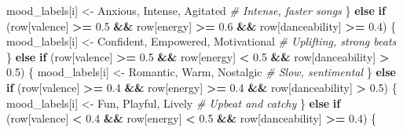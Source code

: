 \documentclass[
]{article}
\newenvironment{Shaded}{\begin{snugshade}}{\end{snugshade}}
\newcommand{\CommentTok}[1]{\textcolor[rgb]{0.56,0.35,0.01}{\textit{#1}}}
\newcommand{\ControlFlowTok}[1]{\textcolor[rgb]{0.13,0.29,0.53}{\textbf{#1}}}
\newcommand{\FloatTok}[1]{\textcolor[rgb]{0.00,0.00,0.81}{#1}}
\newcommand{\NormalTok}[1]{#1}
\newcommand{\OtherTok}[1]{\textcolor[rgb]{0.56,0.35,0.01}{#1}}
\newcommand{\SpecialCharTok}[1]{\textcolor[rgb]{0.81,0.36,0.00}{\textbf{#1}}}
\newcommand{\StringTok}[1]{\textcolor[rgb]{0.31,0.60,0.02}{#1}}
\begin{document}
\begin{Shaded}
\begin{Highlighting}[]
\NormalTok{    mood\_labels[i] }\OtherTok{\textless{}{-}} \StringTok{\textquotesingle{}Anxious, Intense, Agitated\textquotesingle{}}  \CommentTok{\# Intense, faster songs}
\NormalTok{  \} }\ControlFlowTok{else} \ControlFlowTok{if}\NormalTok{ (row[}\StringTok{\textquotesingle{}valence\textquotesingle{}}\NormalTok{] }\SpecialCharTok{\textgreater{}=} \FloatTok{0.5} \SpecialCharTok{\&\&}\NormalTok{ row[}\StringTok{\textquotesingle{}energy\textquotesingle{}}\NormalTok{] }\SpecialCharTok{\textgreater{}=} \FloatTok{0.6} \SpecialCharTok{\&\&}\NormalTok{ row[}\StringTok{\textquotesingle{}danceability\textquotesingle{}}\NormalTok{] }\SpecialCharTok{\textgreater{}=} \FloatTok{0.4}\NormalTok{) \{}
\NormalTok{    mood\_labels[i] }\OtherTok{\textless{}{-}} \StringTok{\textquotesingle{}Confident, Empowered, Motivational\textquotesingle{}}  \CommentTok{\# Uplifting, strong beats}
\NormalTok{  \} }\ControlFlowTok{else} \ControlFlowTok{if}\NormalTok{ (row[}\StringTok{\textquotesingle{}valence\textquotesingle{}}\NormalTok{] }\SpecialCharTok{\textgreater{}=} \FloatTok{0.5} \SpecialCharTok{\&\&}\NormalTok{ row[}\StringTok{\textquotesingle{}energy\textquotesingle{}}\NormalTok{] }\SpecialCharTok{\textless{}} \FloatTok{0.5} \SpecialCharTok{\&\&}\NormalTok{ row[}\StringTok{\textquotesingle{}danceability\textquotesingle{}}\NormalTok{] }\SpecialCharTok{\textgreater{}} \FloatTok{0.5}\NormalTok{) \{}
\NormalTok{    mood\_labels[i] }\OtherTok{\textless{}{-}} \StringTok{\textquotesingle{}Romantic, Warm, Nostalgic\textquotesingle{}}  \CommentTok{\# Slow, sentimental}
\NormalTok{  \} }\ControlFlowTok{else} \ControlFlowTok{if}\NormalTok{ (row[}\StringTok{\textquotesingle{}valence\textquotesingle{}}\NormalTok{] }\SpecialCharTok{\textgreater{}=} \FloatTok{0.4} \SpecialCharTok{\&\&}\NormalTok{ row[}\StringTok{\textquotesingle{}energy\textquotesingle{}}\NormalTok{] }\SpecialCharTok{\textgreater{}=} \FloatTok{0.4} \SpecialCharTok{\&\&}\NormalTok{ row[}\StringTok{\textquotesingle{}danceability\textquotesingle{}}\NormalTok{] }\SpecialCharTok{\textgreater{}} \FloatTok{0.5}\NormalTok{) \{}
\NormalTok{    mood\_labels[i] }\OtherTok{\textless{}{-}} \StringTok{\textquotesingle{}Fun, Playful, Lively\textquotesingle{}}  \CommentTok{\# Upbeat and catchy}
\NormalTok{  \} }\ControlFlowTok{else} \ControlFlowTok{if}\NormalTok{ (row[}\StringTok{\textquotesingle{}valence\textquotesingle{}}\NormalTok{] }\SpecialCharTok{\textless{}} \FloatTok{0.4} \SpecialCharTok{\&\&}\NormalTok{ row[}\StringTok{\textquotesingle{}energy\textquotesingle{}}\NormalTok{] }\SpecialCharTok{\textless{}} \FloatTok{0.5} \SpecialCharTok{\&\&}\NormalTok{ row[}\StringTok{\textquotesingle{}danceability\textquotesingle{}}\NormalTok{] }\SpecialCharTok{\textgreater{}=} \FloatTok{0.4}\NormalTok{) \{}

\end{Highlighting}
\end{Shaded}
\end{document}
